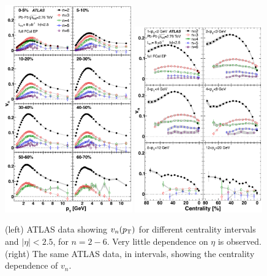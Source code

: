 \begin{figure}[!htb]
\begin{center}
\includegraphics[width=0.49\textwidth]{flowcorrelations_figs/atlas_vn_fig_04.pdf}
\includegraphics[width=0.49\textwidth]{flowcorrelations_figs/atlas_vn_fig_05.pdf}
\caption[]{(left) ATLAS data showing $v_n(\mbox{$p_{\mathrm{T}}$})$ for different centrality intervals and $|\eta|<2.5$, for $n=2-6$.  Very little dependence on $\eta$ is observed.  
(right) The same ATLAS data, in \pT intervals, showing the centrality dependence of $v_n$.}
\label{fig:pas:fc:vn}
\end{center}
\end{figure}

